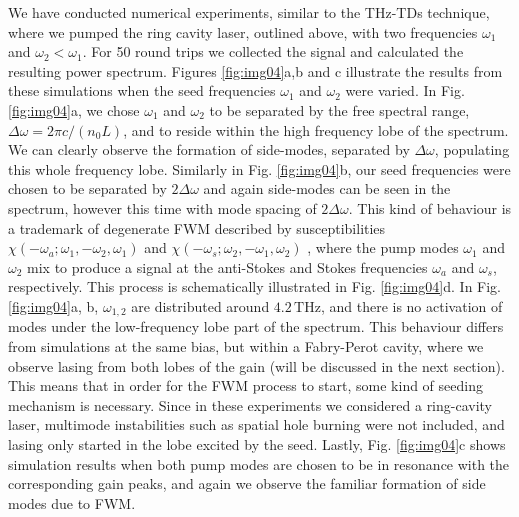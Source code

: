 \documentclass[10pt,letterpaper]{article}%
\begin{document}
We have conducted numerical experiments, similar to the THz-TDs technique,
where we pumped the ring cavity laser, outlined above, with two frequencies
$\omega_{1}$ and $\omega_{2}<\omega_{1}$. For 50 round trips we collected the
signal and calculated the resulting power spectrum. Figures \ref{fig:img04}a,b
and c illustrate the results from these simulations when the seed frequencies
$\omega_{1}$ and $\omega_{2}$ were varied. In Fig. \ref{fig:img04}a, we chose
$\omega_{1}$ and $\omega_{2}$ to be separated by the free spectral range,
$\Delta\omega=2\pi c/\left(  n_{0}L\right)  $, and to reside within the high
frequency lobe of the spectrum. We can clearly observe the formation of
side-modes, separated by $\Delta\omega$, populating this whole frequency lobe.
Similarly in Fig. \ref{fig:img04}b, our seed frequencies were chosen to be
separated by $2\Delta\omega$ and again side-modes can be seen in the spectrum,
however this time with mode spacing of $2\Delta\omega$. This kind of behaviour
is a trademark of degenerate FWM described by susceptibilities $\chi
(-\omega_{a};\omega_{1},-\omega_{2},\omega_{1})$ and $\chi(-\omega_{s}%
;\omega_{2},-\omega_{1},\omega_{2})$ \cite{butcher1991elements}, where the
pump modes $\omega_{1}$ and $\omega_{2}$ mix to produce a signal at the
anti-Stokes and Stokes frequencies $\omega_{a}$ and $\omega_{s}$,
respectively. This process is schematically illustrated in Fig.
\ref{fig:img04}d. In Fig. \ref{fig:img04}a, b, $\omega_{1,2}$ are distributed
around $4.2{\,}\mathrm{THz}$, and there is no activation of modes under the
low-frequency lobe part of the spectrum. This behaviour differs from simulations 
at the same bias, but within a Fabry-Perot cavity, where we observe lasing 
from both lobes of the gain (will be discussed in the next section). 
This means that in order for the FWM process to start, some kind of
seeding mechanism is necessary. Since in these experiments we considered a
ring-cavity laser, multimode instabilities such as spatial hole burning
\cite{gordon2008multimode} were not included, and lasing only started in the
lobe excited by the seed.\textrm{ }Lastly, Fig. \ref{fig:img04}c shows
simulation results when both pump modes are chosen to be in resonance with the
corresponding gain peaks, and again we observe the familiar formation of side
modes due to FWM.
\end{document}
